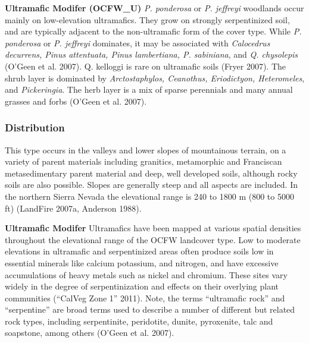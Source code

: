 \begin{adjustwidth}{2cm}{}

\textbf{Ultramafic Modifer (OCFW\_U)}  \emph{P. ponderosa} or \emph{P. jeffreyi} woodlands occur mainly on low-elevation ultramafics. They grow on strongly serpentinized soil, and are typically adjacent to the non-ultramafic form of the cover type. While \emph{P. ponderosa} or \emph{P. jeffreyi} dominates, it may be associated with \emph{Calocedrus decurrens, Pinus attentuata, Pinus lambertiana, P. sabiniana}, and \emph{Q. chysolepis} (O’Geen et al. 2007). Q. kelloggi is rare on ultramafic soils (Fryer 2007). The shrub layer is dominated by \emph{Arctostaphylos, Ceanothus, Eriodictyon, Heteromeles}, and \emph{Pickeringia}. The herb layer is a mix of sparse perennials and many annual grasses and forbs (O’Geen et al. 2007). 

\end{adjustwidth}


\subsubsection{Distribution}
This type occurs in the valleys and lower slopes of mountainous terrain, on a variety of parent materials including granitics, metamorphic and Franciscan metasedimentary parent material and deep, well developed soils, although rocky soils are also possible. Slopes are generally steep and all aspects are included. In the northern Sierra Nevada the elevational range is 240 to 1800 m (800 to 5000 ft) (LandFire 2007a, Anderson 1988).

\begin{adjustwidth}{2cm}{}

\textbf{Ultramafic Modifer} Ultramafics have been mapped at various spatial densities throughout the elevational range of the OCFW landcover type. Low to moderate elevations in ultramafic and serpentinized areas often produce soils low in essential minerals like calcium potassium, and nitrogen, and have excessive accumulations of heavy metals such as nickel and chromium. These sites vary widely in the degree of serpentinization and effects on their overlying plant communities (``CalVeg Zone 1'' 2011). Note, the terms ``ultramafic rock'' and ``serpentine'' are broad terms used to describe a number of different but related rock types, including serpentinite, peridotite, dunite, pyroxenite, talc and soapstone, among others (O’Geen et al. 2007).


\end{adjustwidth}

